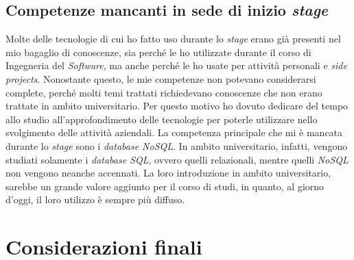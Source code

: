 \subsection{Competenze mancanti in sede di inizio \emph{stage}}
Molte delle tecnologie di cui ho fatto uso durante lo \emph{stage} erano già presenti nel mio bagaglio di conoscenze, sia perché le ho utilizzate durante il corso di Ingegneria del \emph{Software}, ma anche perché le ho usate per attività personali e \emph{side projects}.
Nonostante questo, le mie competenze non potevano considerarsi complete, perché molti temi trattati richiedevano conoscenze che non erano trattate in ambito universitario.
Per questo motivo ho dovuto dedicare del tempo allo studio all'approfondimento delle tecnologie per poterle utilizzare nello svolgimento delle attività aziendali.
La competenza principale che mi è mancata durante lo \emph{stage} sono i \emph{database NoSQL}.
In ambito universitario, infatti, vengono studiati solamente i \emph{database SQL}, ovvero quelli relazionali, mentre quelli \emph{NoSQL} non vengono neanche accennati.
La loro introduzione in ambito universitario, sarebbe un grande valore aggiunto per il corso di studi, in quanto, al giorno d'oggi, il loro utilizzo è sempre più diffuso.

\section{Considerazioni finali}
